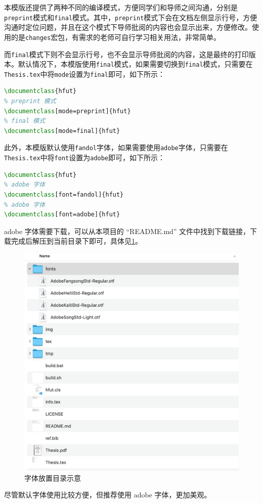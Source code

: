 本模版还提供了两种不同的编译模式，方便同学们和导师之间沟通，分别是\texttt{preprint}模式和\texttt{final}模式。其中，\texttt{preprint}模式下会在文档左侧显示行号，方便沟通时定位问题，并且在这个模式下导师批阅的内容也会显示出来，方便修改。使用的是\texttt{changes}宏包，有需求的老师可自行学习相关用法，非常简单。

而\texttt{final}模式下则不会显示行号，也不会显示导师批阅的内容，这是最终的打印版本。默认情况下，本模版使用\texttt{final}模式，如果需要切换到\texttt{final}模式，只需要在\texttt{Thesis.tex}中将\texttt{mode}设置为\texttt{final}即可，如下所示：

\begin{lstlisting}[language=TeX]
% final 模式
\documentclass{hfut}
% preprint 模式
\documentclass[mode=preprint]{hfut}
% final 模式
\documentclass[mode=final]{hfut}
\end{lstlisting}

此外，本模版默认使用\texttt{fandol}字体，如果需要使用\texttt{adobe}字体，只需要在\texttt{Thesis.tex}中将\texttt{font}设置为\texttt{adobe}即可，如下所示：

\begin{lstlisting}[language=TeX]
% fandol 字体
\documentclass{hfut}
% adobe 字体
\documentclass[font=fandol]{hfut}
% adobe 字体
\documentclass[font=adobe]{hfut}
\end{lstlisting}

adobe 字体需要下载，可以从本项目的 ``README.md'' 文件中找到下载链接，下载完成后解压到当前目录下即可，具体见\cref{fig_fonts}。

\begin{figure}[htb!]
    \centering
    \includegraphics[width=.5\textwidth]{./img/fonts.png}
    \caption{字体放置目录示意}
    \label{fig_fonts}
\end{figure}

尽管默认字体使用比较方便，但推荐使用 adobe 字体，更加美观。

